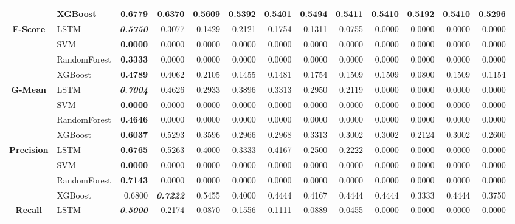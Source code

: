 \begin{table}[H]
\begin{adjustbox}{max width=14cm}
\begin{tabular}{|c|l|r|r|r|r|r|r|r|r|r|r|r|}
		&  XGBoost & \textbf{  0.6779 } &  0.6370 &  0.5609 &  0.5392 &  0.5401 &  0.5494 &  0.5411 &  0.5410 &  0.5192 &  0.5410 &  0.5296 \\
		\hline
		\textbf{F-Score} &  LSTM & \textit{ \textbf{  0.5750 } } &  0.3077 &  0.1429 &  0.2121 &  0.1754 &  0.1311 &  0.0755 &  0.0000 &  0.0000 &  0.0000 &  0.0000 \\
		&  SVM & \textbf{  0.0000 } &  0.0000 &  0.0000 &  0.0000 &  0.0000 &  0.0000 &  0.0000 &  0.0000 &  0.0000 &  0.0000 &  0.0000 \\
		&  RandomForest & \textbf{  0.3333 } &  0.0000 &  0.0000 &  0.0000 &  0.0000 &  0.0000 &  0.0000 &  0.0000 &  0.0000 &  0.0000 &  0.0000 \\
		&  XGBoost & \textbf{  0.4789 } &  0.4062 &  0.2105 &  0.1455 &  0.1481 &  0.1754 &  0.1509 &  0.1509 &  0.0800 &  0.1509 &  0.1154 \\
		\hline
		\textbf{G-Mean} &  LSTM & \textit{ \textbf{  0.7004 } } &  0.4626 &  0.2933 &  0.3896 &  0.3313 &  0.2950 &  0.2119 &  0.0000 &  0.0000 &  0.0000 &  0.0000 \\
		&  SVM & \textbf{  0.0000 } &  0.0000 &  0.0000 &  0.0000 &  0.0000 &  0.0000 &  0.0000 &  0.0000 &  0.0000 &  0.0000 &  0.0000 \\
		&  RandomForest & \textbf{  0.4646 } &  0.0000 &  0.0000 &  0.0000 &  0.0000 &  0.0000 &  0.0000 &  0.0000 &  0.0000 &  0.0000 &  0.0000 \\
		&  XGBoost & \textbf{  0.6037 } &  0.5293 &  0.3596 &  0.2966 &  0.2968 &  0.3313 &  0.3002 &  0.3002 &  0.2124 &  0.3002 &  0.2600 \\
		\hline
		\textbf{Precision} &  LSTM & \textbf{  0.6765 } &  0.5263 &  0.4000 &  0.3333 &  0.4167 &  0.2500 &  0.2222 &  0.0000 &  0.0000 &  0.0000 &  0.0000 \\
		&  SVM & \textbf{  0.0000 } &  0.0000 &  0.0000 &  0.0000 &  0.0000 &  0.0000 &  0.0000 &  0.0000 &  0.0000 &  0.0000 &  0.0000 \\
		&  RandomForest & \textbf{  0.7143 } &  0.0000 &  0.0000 &  0.0000 &  0.0000 &  0.0000 &  0.0000 &  0.0000 &  0.0000 &  0.0000 &  0.0000 \\
		&  XGBoost &  0.6800 & \textit{ \textbf{  0.7222 } } &  0.5455 &  0.4000 &  0.4444 &  0.4167 &  0.4444 &  0.4444 &  0.3333 &  0.4444 &  0.3750 \\
		\hline
		\textbf{Recall} &  LSTM & \textit{ \textbf{  0.5000 } } &  0.2174 &  0.0870 &  0.1556 &  0.1111 &  0.0889 &  0.0455 &  0.0000 &  0.0000 &  0.0000 &  0.0000 \\

\end{tabular}
\end{adjustbox}
\end{table}
